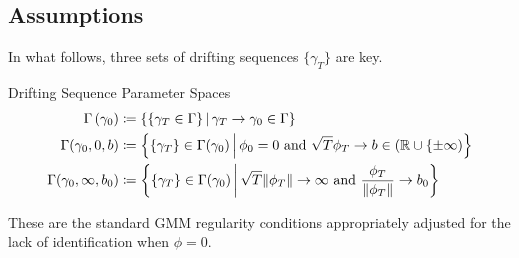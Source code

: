 \documentclass[11pt, letterpaper, twoside, final]{article}
\begin{document}
\begin{appendices}

\section{Assumptions}

    In what follows, three sets of drifting sequences $\lbrace \gamma_T \rbrace$ are key. 
    
    \begin{defn}{Drifting Sequence Parameter Spaces}
        \begin{align}
            \Gamma\left(\gamma_0\right) &\coloneqq \left\lbrace \left\lbrace \gamma_T \in \Gamma \right\rbrace
            \mvert \gamma_T \to \gamma_0 \in \Gamma \right\rbrace\\ 
            \Gamma(\gamma_0, 0, b) &\coloneqq \left\lbrace \lbrace \gamma_T \rbrace \in \Gamma(\gamma_0) \mvert
            \phi_0 = 0\ \text{and}\ \sqrt{T} \phi_T \to b \in (\R \cup \lbrace \pm \infty) \right\rbrace \\
            \Gamma(\gamma_0, \infty, b_0) &\coloneqq \left\lbrace \lbrace \gamma_T \rbrace \in \Gamma (\gamma_0)
            \mvert \sqrt{T} \norm{\phi_T} \to \infty\ \text{and}\ \frac{\phi_T}{\norm{\phi_T}} \to b_0
            \right\rbrace 
        \end{align}
    \end{defn}
    
    These are the standard GMM regularity conditions appropriately adjusted for the lack of identification when
    $\phi =0$.
    

\end{appendices}
\end{document}
